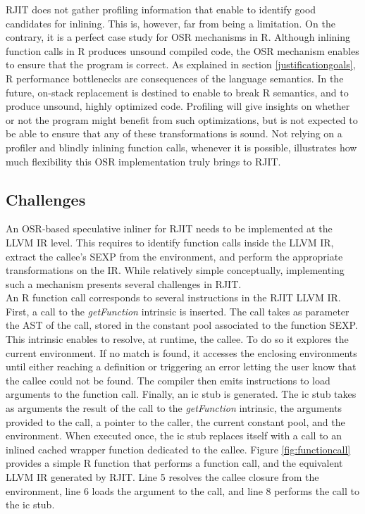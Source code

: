 RJIT does not gather profiling information that enable to identify good candidates for inlining.
This is, however, far from being a limitation.
On the contrary, it is a perfect case study for OSR mechanisms in R.
Although inlining function calls in R produces unsound compiled code, the OSR mechanism enables to ensure that the program is correct.
As explained in section \ref{justificationgoals}, R performance bottlenecks are consequences of the language semantics.
In the future, on-stack replacement is destined to enable to break R semantics, and to produce unsound, highly optimized code.
Profiling will give insights on whether or not the program might benefit from such optimizations, but is not expected to be able to ensure that any of these transformations is sound.
Not relying on a profiler and blindly inlining function calls, whenever it is possible, illustrates how much flexibility this OSR implementation truly brings to RJIT.\\ 

\subsection{Challenges}
An OSR-based speculative inliner for RJIT needs to be implemented at the LLVM IR level.
This requires to identify function calls inside the LLVM IR, extract the callee's SEXP from the environment, and perform the appropriate transformations on the IR.
While relatively simple conceptually, implementing such a mechanism presents several challenges in RJIT.\\

An R function call corresponds to several instructions in the RJIT LLVM IR.
First, a call to the \textit{getFunction} intrinsic is inserted.
The call takes as parameter the AST of the call, stored in the constant pool associated to the function SEXP.
This intrinsic enables to resolve, at runtime, the callee. 
To do so it explores the current environment.
If no match is found, it accesses the enclosing environments until either reaching a definition or triggering an error letting the user know that the callee could not be found.
The compiler then emits instructions to load arguments to the function call.
Finally, an ic stub is generated. 
The ic stub takes as arguments the result of the call to the \textit{getFunction} intrinsic, the arguments provided to the call, a pointer to the caller, the current constant pool, and the environment.
When executed once, the ic stub replaces itself with a call to an inlined cached wrapper function dedicated to the callee.
Figure \ref{fig:functioncall} provides a simple R function that performs a function call, and the equivalent LLVM IR generated by RJIT.
Line 5 resolves the callee closure from the environment, line 6 loads the argument to the call, and line 8 performs the call to the ic stub.\\

